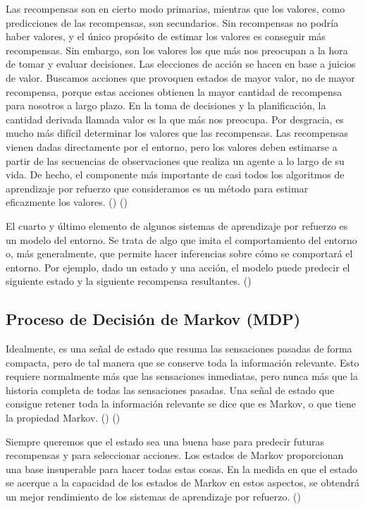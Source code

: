 Las recompensas son en cierto modo primarias, mientras que los valores, como predicciones de las recompensas, son secundarios. Sin recompensas no podría haber valores, y el único propósito de estimar los valores es conseguir más recompensas. Sin embargo, son los valores los que más nos preocupan a la hora de tomar y evaluar decisiones. Las elecciones de acción se hacen en base a juicios de valor. Buscamos acciones que provoquen estados de mayor valor, no de mayor recompensa, porque estas acciones obtienen la mayor cantidad de recompensa para nosotros a largo plazo. En la toma de decisiones y la planificación, la cantidad derivada llamada valor es la que más nos preocupa. Por desgracia, es mucho más difícil determinar los valores que las recompensas. Las recompensas vienen dadas directamente por el entorno, pero los valores deben estimarse a partir de las secuencias de observaciones que realiza un agente a lo largo de su vida. De hecho, el componente más importante de casi todos los algoritmos de aprendizaje por refuerzo que consideramos es un método para estimar eficazmente los valores. (\cite{sutton1998introduction}) (\cite{rao2000reinforcement})

El cuarto y último elemento de algunos sistemas de aprendizaje por refuerzo es un modelo del entorno. Se trata de algo que imita el comportamiento del entorno o, más generalmente, que permite hacer inferencias sobre cómo se comportará el entorno. Por ejemplo, dado un estado y una acción, el modelo puede predecir el siguiente estado y la siguiente recompensa resultantes. (\cite{sutton1998introduction})

\subsection{Proceso de Decisión de Markov (MDP)}

Idealmente, es una señal de estado que resuma las sensaciones pasadas de forma compacta, pero de tal manera que se conserve toda la información relevante. Esto requiere normalmente más que las sensaciones inmediatas, pero nunca más que la historia completa de todas las sensaciones pasadas. Una señal de estado que consigue retener toda la información relevante se dice que es Markov, o que tiene la propiedad Markov. (\cite{rao2000reinforcement}) (\cite{wiering2012reinforcement})

Siempre queremos que el estado sea una buena base para predecir futuras recompensas y para seleccionar acciones. Los estados de Markov proporcionan una base insuperable para hacer todas estas cosas. En la medida en que el estado se acerque a la capacidad de los estados de Markov en estos aspectos, se obtendrá un mejor rendimiento de los sistemas de aprendizaje por refuerzo. (\cite{wiering2012reinforcement})


